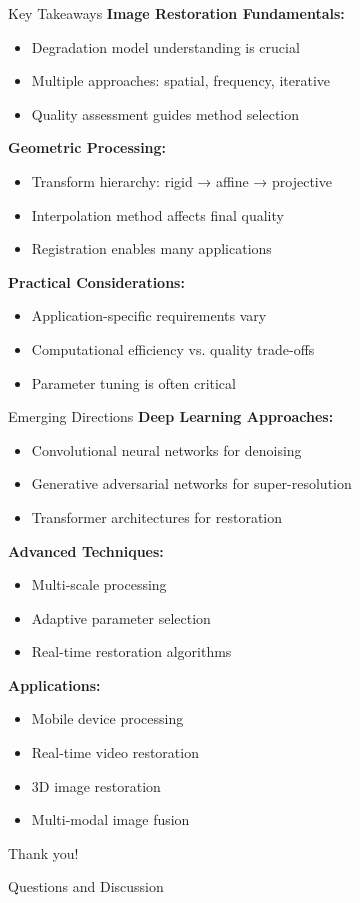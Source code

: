 \documentclass[aspectratio=169,10pt]{beamer}
\begin{document}
\begin{frame}{Key Takeaways}
    \textbf{Image Restoration Fundamentals:}
    \begin{itemize}
        \item Degradation model understanding is crucial
        \item Multiple approaches: spatial, frequency, iterative
        \item Quality assessment guides method selection
    \end{itemize}

    \textbf{Geometric Processing:}
    \begin{itemize}
        \item Transform hierarchy: rigid → affine → projective
        \item Interpolation method affects final quality
        \item Registration enables many applications
    \end{itemize}

    \textbf{Practical Considerations:}
    \begin{itemize}
        \item Application-specific requirements vary
        \item Computational efficiency vs. quality trade-offs
        \item Parameter tuning is often critical
    \end{itemize}
\end{frame}

\begin{frame}{Emerging Directions}
    \textbf{Deep Learning Approaches:}
    \begin{itemize}
        \item Convolutional neural networks for denoising
        \item Generative adversarial networks for super-resolution
        \item Transformer architectures for restoration
    \end{itemize}

    \textbf{Advanced Techniques:}
    \begin{itemize}
        \item Multi-scale processing
        \item Adaptive parameter selection
        \item Real-time restoration algorithms
    \end{itemize}

    \textbf{Applications:}
    \begin{itemize}
        \item Mobile device processing
        \item Real-time video restoration
        \item 3D image restoration
        \item Multi-modal image fusion
    \end{itemize}
\end{frame}

\begin{frame}[standout]
    \Large Thank you!

    \vspace{1cm}

    \normalsize
    Questions and Discussion
\end{frame}
\end{document}
